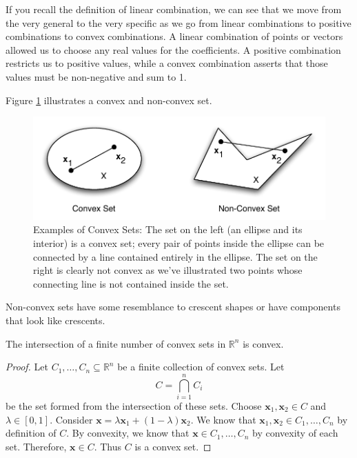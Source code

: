 \begin{remark} If you recall the definition of linear combination, we can see that we move from the very general to the very specific as we go from linear combinations to positive combinations to convex combinations. A linear combination of points or vectors allowed us to choose any real values for the coefficients. A positive combination restricts us to positive values, while a convex combination asserts that those values must be non-negative and sum to 1.
\end{remark}

\begin{example}
Figure \ref{fig:ConvexSets} illustrates a convex and non-convex set.
\begin{figure}[htbp]
\centering
\includegraphics[scale=0.5]{ConvexSets.pdf}
\caption{Examples of Convex Sets: The set on the left (an ellipse and its interior) is a convex set; every pair of points inside the ellipse can be connected by a line contained entirely in the ellipse. The set on the right is clearly not convex as we've illustrated two points whose connecting line is not contained inside the set.}
\label{fig:ConvexSets}
\end{figure}
Non-convex sets have some resemblance to crescent shapes or have components that look like crescents.
\end{example}

\begin{theorem} The intersection of a finite number of convex sets in $\mathbb{R}^n$ is convex.
\end{theorem}
\begin{proof} Let $C_1,\dots,C_n \subseteq \mathbb{R}^n$  be a finite collection of convex sets. Let 
\begin{equation}
C = \bigcap_{i=1}^{n} C_i
\end{equation}
be the set formed from the intersection of these sets. Choose $\mathbf{x}_1,\mathbf{x}_2 \in C$ and $\lambda \in [0,1]$. Consider $\mathbf{x} = \lambda\mathbf{x}_1 + (1-\lambda)\mathbf{x}_2$. We know that $\mathbf{x}_1,\mathbf{x}_2 \in C_1,\dots,C_n$ by definition of $C$. By convexity, we know that $\mathbf{x} \in C_1,\dots,C_n$ by convexity of each set. Therefore, $\mathbf{x} \in C$. Thus $C$ is a convex set.
\end{proof}

